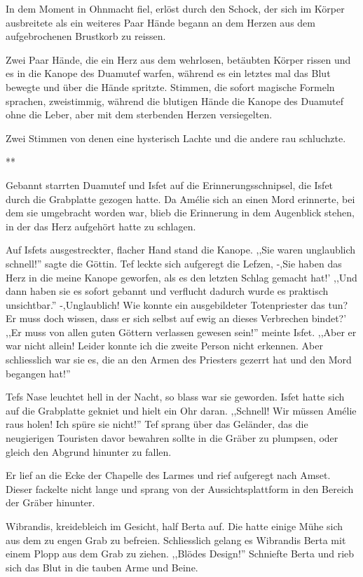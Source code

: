 \documentclass[11pt,titlepage,a5paper]{book}
\newcommand{\sterne}{\par{\centering ***\par}}
\begin{document}
In dem Moment in Ohnmacht fiel, erlöst durch den Schock, der sich im Körper ausbreitete als ein weiteres Paar Hände begann an dem Herzen aus dem aufgebrochenen Brustkorb zu reissen.

Zwei Paar Hände, die ein Herz aus dem wehrlosen, betäubten Körper rissen und es in die Kanope des Duamutef warfen, während es ein letztes mal das Blut bewegte und über die Hände spritzte. Stimmen, die sofort magische Formeln sprachen, zweistimmig, während die blutigen Hände die Kanope des Duamutef ohne die Leber, aber mit dem sterbenden Herzen versiegelten. 

Zwei Stimmen von denen eine hysterisch Lachte und die andere rau schluchzte.

\sterne

Gebannt starrten Duamutef und Isfet auf die Erinnerungsschnipsel, die Isfet durch die Grabplatte gezogen hatte. Da Amélie sich an einen Mord erinnerte, bei dem sie umgebracht worden war, blieb die Erinnerung in dem Augenblick stehen, in der das Herz aufgehört hatte zu schlagen. 

Auf Isfets ausgestreckter, flacher Hand stand die Kanope. ,,Sie waren unglaublich schnell!'' sagte die Göttin. Tef leckte sich aufgeregt die Lefzen, -,Sie haben das Herz in die meine Kanope geworfen, als es den letzten Schlag gemacht hat!' ,,Und dann haben sie es sofort gebannt und verflucht dadurch wurde es praktisch unsichtbar.'' -,Unglaublich! Wie konnte ein ausgebildeter Totenpriester das tun? Er muss doch wissen, dass er sich selbst auf ewig an dieses Verbrechen bindet?' ,,Er muss von allen guten Göttern verlassen gewesen sein!'' meinte Isfet. ,,Aber er war nicht allein! Leider konnte ich die zweite Person nicht erkennen. Aber schliesslich war sie es, die an den Armen des Priesters gezerrt hat und den Mord begangen hat!''

Tefs Nase leuchtet hell in der Nacht, so blass war sie geworden. Isfet hatte sich auf die Grabplatte gekniet und hielt ein Ohr daran. ,,Schnell! Wir müssen Amélie raus holen! Ich spüre sie nicht!'' Tef sprang über das Geländer, das die neugierigen Touristen davor bewahren sollte in die Gräber zu plumpsen, oder gleich den Abgrund hinunter zu fallen.

Er lief an die Ecke der Chapelle des Larmes und rief aufgeregt nach Amset. Dieser fackelte nicht lange und sprang von der Aussichtsplattform in den Bereich der Gräber hinunter. 

Wibrandis, kreidebleich im Gesicht, half Berta auf. Die hatte einige Mühe sich aus dem zu engen Grab zu befreien. Schliesslich gelang es Wibrandis Berta mit einem Plopp aus dem Grab zu ziehen. ,,Blödes Design!'' Schniefte Berta und rieb sich das Blut in die tauben Arme und Beine.
\end{document}
